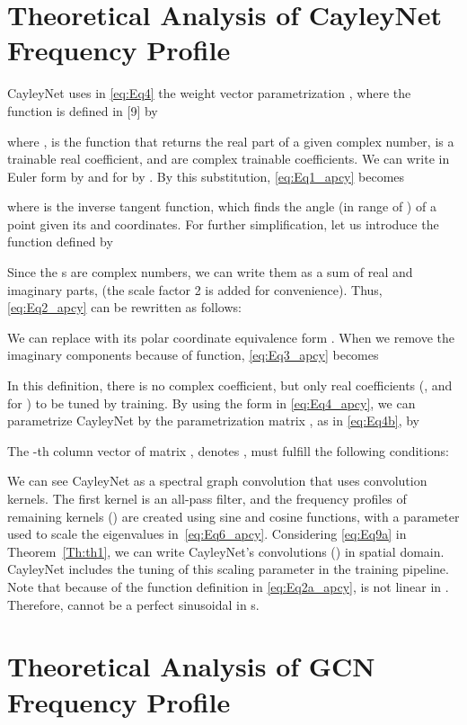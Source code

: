 \documentclass{article}
\begin{document}
\section{Theoretical Analysis of CayleyNet Frequency Profile}
\label{section:cayleydetails}



CayleyNet uses in \eqref{eq:Eq4} the weight vector parametrization , where the function  is defined in [9] by

where ,  is the function that returns the real part of a given complex number,  is a trainable real coefficient, and  are complex trainable coefficients. We can write  in Euler form by  and for  by . By this substitution, \eqref{eq:Eq1_apcy} becomes

where  is the inverse tangent function, which finds the angle (in range of ) of a point given its  and  coordinates. For further simplification, let us introduce the  function defined by

Since the s are complex numbers, we can write them as a sum of real and imaginary parts,  (the scale factor 2 is added for convenience). Thus, \eqref{eq:Eq2_apcy} can be rewritten as follows:

We can replace  with its polar coordinate equivalence form  . When we remove the imaginary components because of  function, \eqref{eq:Eq3_apcy} becomes

In this definition, there is no complex coefficient, but only real coefficients (,  and  for ) to be tuned by training. By using the form in \eqref{eq:Eq4_apcy}, we can  parametrize CayleyNet by the parametrization matrix , as in \eqref{eq:Eq4b}, by

The -th column vector of matrix , denotes , must fulfill the following conditions:

We can see CayleyNet as a spectral graph convolution that uses  convolution kernels. The first kernel is an all-pass filter, and  the frequency profiles of remaining  kernels () are created using sine and cosine functions, with a parameter  used to scale the eigenvalues in~\eqref{eq:Eq6_apcy}. Considering \eqref{eq:Eq9a} in Theorem~\ref{Th:th1}, we can write CayleyNet's convolutions () in spatial domain. CayleyNet includes the tuning of this scaling parameter in the  training pipeline. Note that because of the function definition in \eqref{eq:Eq2a_apcy},  is not linear in . Therefore,  cannot be a perfect sinusoidal in s. 

\section{Theoretical Analysis of GCN Frequency Profile}
\label{section:gcndetails}
\end{document}
